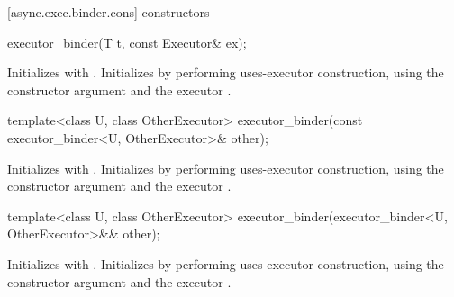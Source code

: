 [async.exec.binder.cons]{ constructors}

%
\begin{itemdecl}
executor_binder(T t, const Executor& ex);
\end{itemdecl}

\begin{itemdescr}
\pnum
\effects Initializes  with . Initializes  by performing uses-executor construction, using the constructor argument  and the executor .
\end{itemdescr}

\begin{itemdecl}
template<class U, class OtherExecutor>
  executor_binder(const executor_binder<U, OtherExecutor>& other);
\end{itemdecl}

\begin{itemdescr}
\pnum
{}

\pnum
\effects Initializes  with . Initializes  by performing uses-executor construction, using the constructor argument  and the executor .
\end{itemdescr}

\begin{itemdecl}
template<class U, class OtherExecutor>
  executor_binder(executor_binder<U, OtherExecutor>&& other);
\end{itemdecl}

\begin{itemdescr}
\pnum
{}

\pnum
\effects Initializes  with . Initializes  by performing uses-executor construction, using the constructor argument  and the executor .
\end{itemdescr}

